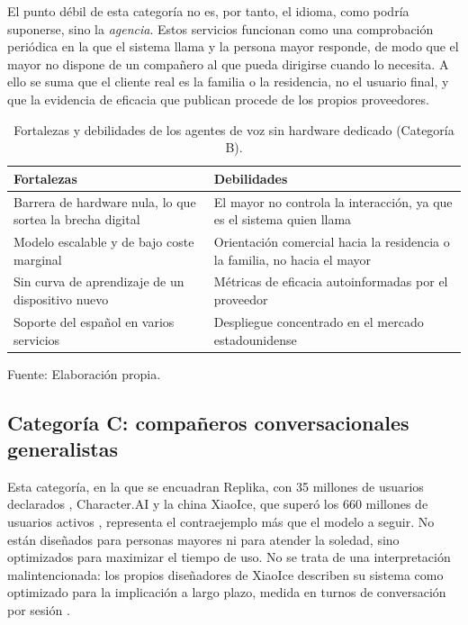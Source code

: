 El punto débil de esta categoría no es, por tanto, el idioma, como podría suponerse, sino la \textit{agencia}.
Estos servicios funcionan como una comprobación periódica en la que el sistema llama y la persona mayor
responde, de modo que el mayor no dispone de un compañero al que pueda dirigirse cuando lo necesita. A ello se
suma que el cliente real es la familia o la residencia, no el usuario final, y que la evidencia de eficacia
que publican procede de los propios proveedores.

\begin{table}[htbp]
    \centering
    \caption{Fortalezas y debilidades de los agentes de voz sin hardware dedicado (Categoría B).}
    \label{tab:cat-b-voz}
    \begin{tabularx}{\textwidth}{>{\RaggedRight\arraybackslash}X >{\RaggedRight\arraybackslash}X}
        \toprule
        \textbf{Fortalezas} & \textbf{Debilidades} \\
        \midrule
        Barrera de hardware nula, lo que sortea la brecha digital & El mayor no controla la interacción, ya que es el sistema quien llama \\
        Modelo escalable y de bajo coste marginal & Orientación comercial hacia la residencia o la familia, no hacia el mayor \\
        Sin curva de aprendizaje de un dispositivo nuevo & Métricas de eficacia autoinformadas por el proveedor \\
        Soporte del español en varios servicios & Despliegue concentrado en el mercado estadounidense \\
        \bottomrule
    \end{tabularx}

    \vspace{2pt}
    {\footnotesize Fuente: Elaboración propia.}
\end{table}

\subsection{Categoría C: compañeros conversacionales generalistas}

Esta categoría, en la que se encuadran Replika, con 35 millones de usuarios declarados
\citep{Replika35M}, Character.AI y la china XiaoIce, que superó los 660 millones de usuarios
activos \citep{Zhou2020}, representa el contraejemplo más que el modelo a seguir. No están diseñados para
personas mayores ni para atender la soledad, sino optimizados para maximizar el tiempo de uso. No se trata de
una interpretación malintencionada: los propios diseñadores de XiaoIce describen su sistema como optimizado
para la implicación a largo plazo, medida en turnos de conversación por sesión \citep{Zhou2020}.

